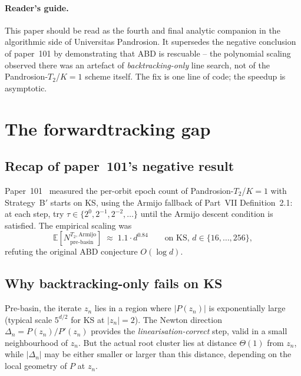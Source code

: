 \documentclass[11pt,a4paper]{article}
\begin{document}
\begin{abstract}
We do \emph{not} claim a complexity-theoretic improvement upon Beltr\'an--Pardo~\cite{beltranpardo} or Lairez~\cite{lairez}, who together resolve Smale's 17th problem. The contribution is to identify the missing super-linear mechanism for the Pandrosion-$T_2$/$K{=}1$ scheme specifically, restoring ABD's $O(\log d)$ epoch count under the modification.
\end{abstract}

\paragraph{Reader's guide.}
This paper should be read as the fourth and final analytic companion in the algorithmic side of Universitas Pandrosion. It supersedes the negative conclusion of paper~101 by demonstrating that ABD is rescuable -- the polynomial scaling observed there was an artefact of \emph{backtracking-only} line search, not of the Pandrosion-$T_2$/$K{=}1$ scheme itself. The fix is one line of code; the speedup is asymptotic.

\tableofcontents

\section{The forwardtracking gap}\label{sec:gap}

\subsection{Recap of paper~101's negative result}
Paper~101~\cite{besevic101} measured the per-orbit epoch count of Pandrosion-$T_2$/$K{=}1$ with Strategy~B$'$ starts on KS, using the Armijo fallback of Part~VII Definition~2.1: at each step, try $\tau \in \{2^{0}, 2^{-1}, 2^{-2}, \dots\}$ until the Armijo descent condition is satisfied. The empirical scaling was
\begin{equation}\label{eq:101-result}
\mathbb{E}[N_{\text{pre-basin}}^{T_2,\text{Armijo}}] \;\approx\; 1.1\cdot d^{0.84} \qquad \text{on KS, } d \in \{16,\dots,256\},
\end{equation}
refuting the original ABD conjecture $O(\log d)$.

\subsection{Why backtracking-only fails on KS}

Pre-basin, the iterate $z_n$ lies in a region where $|P(z_n)|$ is exponentially large (typical scale $5^{d/2}$ for KS at $|z_n| = 2$). The Newton direction $\Delta_n = P(z_n)/P'(z_n)$ provides the \emph{linearisation-correct} step, valid in a small neighbourhood of $z_n$. But the actual root cluster lies at distance $\Theta(1)$ from $z_n$, while $|\Delta_n|$ may be either smaller or larger than this distance, depending on the local geometry of $P$ at $z_n$.
\end{document}
